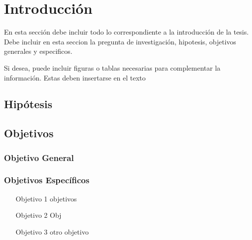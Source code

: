 \chapter{Introducción}
En esta sección debe incluir todo lo correspondiente a la introducción de la tesis. 
Debe incluir en esta seccion la pregunta de investigación, hipotesis, objetivos generales y especificos.

Si desea, puede incluir figuras o tablas necesarias para complementar la información.
Estas deben insertarse en el texto 

\section{Hipótesis}

\section{Objetivos}
\subsection{Objetivo General}

\subsection{Objetivos Específicos}
\begin{itemize}
    \item[Objetivo 1] objetivos
    \item[Objetivo 2] Obj
    \item[Objetivo 3] otro objetivo  
\end{itemize}